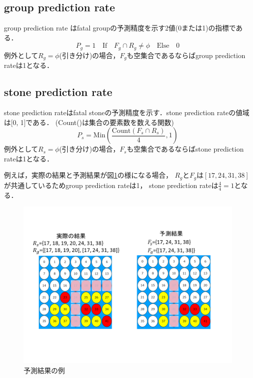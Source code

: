 \subsection{group prediction rate}
group prediction rate はfatal groupの予測精度を示す2値(0または1)の指標である．
\begin{equation}
	{P_g = 1 \quad \textrm{If} \quad F_g \cap R_g \ne \phi \quad \textrm{Else} \quad 0}
\end{equation}
例外として$R_g=\phi$(引き分け)の場合，$F_g$も空集合であるならばgroup prediction rateは1となる．
\subsection{stone prediction rate}
stone prediction rateはfatal stoneの予測精度を示す．stone prediction rateの値域は[0, 1]である．
(Count()は集合の要素数を数える関数)
\begin{equation}
	{P_s = \textrm{Min}(\frac{\textrm{Count}(F_s \cap R_s)}{4}, 1)  }
\end{equation}
例外として$R_s=\phi$(引き分け)の場合，$F_s$も空集合であるならばstone prediction rateは1となる．


例えば，実際の結果と予測結果が図\ref{fig:cal-compare}の様になる場合， $R_g$と$F_g$は$[17, 24, 31, 38]$が共通しているためgroup prediction rateは1， stone prediction rateは$\frac{4}{4}=1$となる．
\begin{figure}[t]
	\centering
	\includegraphics[width=\linewidth]{./figure/cal-compare.png}
	\caption{予測結果の例}
	\label{fig:cal-compare}
\end{figure}


